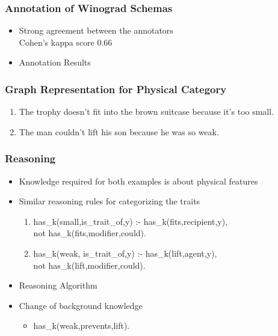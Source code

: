\documentclass[c,8pt,xcolor...,x11names]{beamer}
\newcommand\tab[1][1cm]{\hspace*{#1}}
\begin{document}
\begin{frame}[fragile]
\frametitle{Annotation of Winograd Schemas}
	\begin{itemize}
	\normalsize
	\item Strong agreement between the annotators \\
	Cohen's kappa score 0.66
	\item Annotation Results \\
\end{itemize}
\begin{table}
	\centering
	
\end{table}	
\end{frame}

\begin{frame}[fragile]

\frametitle{Graph Representation for Physical Category}
 \begin{enumerate}	
	\item The trophy doesn't fit into the brown suitcase because it's too small. 
	


 \item The man couldn't lift his son because he was so weak. 
 			 

\end{enumerate}
\end{frame}


\begin{frame}[fragile] \frametitle{Reasoning}

	\begin{itemize}
	\item Knowledge required for both examples is about \alert{physical features} 
	\item Similar reasoning rules for categorizing the traits
	\begin{enumerate}
		\normalsize
		\item has\_k(small,is\_trait\_of,y) :- has\_k(fits,recipient,y),\\
		\tab \tab \tab  \alert{not} has\_k(fits,modifier,could).\\
		\item has\_k(weak, is\_trait\_of,y) :- has\_k(lift,agent,y), \\ 
		\tab \tab \tab	\alert{not} has\_k(lift,modifier,could).
	\end{enumerate}
			\item Reasoning Algorithm
	\onslide<2->		\item Change of background knowledge
	\onslide<2->		\begin{itemize}
		\normalsize
		\item has\_k(weak,prevents,lift).
	\end{itemize} 
	
\end{itemize}
\end{frame}
\end{document}
